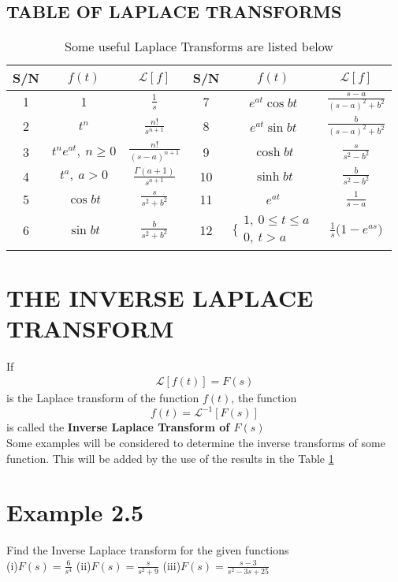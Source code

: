 \documentclass[11pt]{report}
\newcommand{\Laplace}{\mathcal{L}}
\newcommand{\ft}{f(t)}
\newcommand{\Fs}{F(s)}
\newcommand{\sbracket}[1]{\left[#1\right]}
\newcommand{\LFt}{\Laplace \sbracket{\ft}}
\newcommand{\LFn}[1]{\Laplace \sbracket{#1}}
\newcommand{\InverseL}[1]{\Laplace^{-1}\left[#1\right]}
\newcommand{\bt}[1]{\textbf{#1}}
\newcommand{\dsp}{\displaystyle}
\begin{document}
	\subsection{TABLE OF LAPLACE TRANSFORMS}
	\renewcommand{\arraystretch}{1.4}
	\begin{longtable}{|c|c|c|c|c|c|}
		\caption{Some useful Laplace Transforms are listed below} \label{tab:2_1}\\[-0.5cm]
		\hline
			S/N & $f(t)$ & $\LFn{f}$ & S/N & $f(t)$ & $\LFn{f}$\\ \hline
			1 &  1 & $\frac{1}{s}$ & 7 & $e^{at}\cos bt$ & $\dsp\frac{s-a}{(s-a)^2 + b^2}$\\\hline
			2 & $t^n$ & $\dsp\frac{n!}{s^{n+1}}$ & 8 & $\dsp e^{at}\sin bt$ & $\dsp\frac{b}{(s-a)^2 + b^2}$\\\hline
			3 & $\dsp t^n e^{at},~ n\geq 0$& $\dsp \frac{n!}{(s-a)^{n+1}}$ & 9 & $\cosh bt$ & $\dsp\frac{s}{s^2-b^2}$\\\hline
			4 & $\dsp t^a, ~ a > 0 $ & $\dsp \frac{\Gamma(a+1)}{s^{a+1}}$ & 10 & $\sinh bt$ & $\dsp \frac{b}{s^2 - b^2}$\\\hline
			5 & $\cos bt$ & $\dsp \frac{s}{s^2 + b^2}$ & 11 & $e^{at}$ & $\dsp\frac{1}{s-a}$\\\hline
			6 & $\sin bt$ & $\dsp\frac{b}{s^2+b^2}$ & 12 & $\dsp \Bigg\{ \begin{array}{l}
				1,~ 0 \leq t \leq a\\
				0,~ t > a
			\end{array}$ & $\dsp \frac{1}{s}\Big(1-e^{as}\Big)$\\\hline
	\end{longtable}
	
	
	\section{THE INVERSE LAPLACE TRANSFORM}
	If
	\begin{eqnarray*}
		\LFt = F(s)
	\end{eqnarray*}
	is the Laplace transform of the function $\ft$, the function
	\begin{equation*}
		\ft = \InverseL{F(s)}
	\end{equation*}
	is called the \bt{Inverse Laplace Transform of $\Fs$}\\
	Some examples will be considered to determine the inverse transforms of some function. This will be added by the use of the results in the Table \ref{tab:2_1}
	
	\section*{Example 2.5}
	Find the Inverse Laplace transform for the given functions\\
	(i)$\dsp F(s) =\frac{6}{s^4}$ \qquad (ii)$\dsp F(s)=\frac{s}{s^2 + 9}$ \qquad (iii)$\dsp F(s)=\frac{s-3}{s^2-3s + 25}$
	
\end{document}
